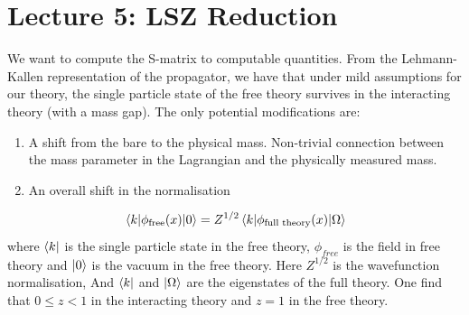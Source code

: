 \section{Lecture 5: LSZ Reduction }
We want to compute the S-matrix to computable quantities. From the Lehmann-Kallen representation of the propagator, we have that under mild assumptions for our theory, the single particle state of the free theory survives in the interacting theory (with a mass gap). The only potential modifications are:
\begin{enumerate}
    \item A shift from the bare to the physical mass. Non-trivial connection between the mass parameter in the Lagrangian and the physically measured mass.

    \item An overall shift in the normalisation
\end{enumerate}  
 \begin{equation}
        \mel{k}{\phi_{\text{free}}(x) }{0} = Z^{1/2}  \mel{k}{\phi_{\text{full theory}}(x) }{\Omega} 
    \end{equation} where $\bra{k}$ is the single particle state in the free theory, $\phi_{free}$ is the field in free theory and $\ket{0}$ is the vacuum in the free theory. Here $Z^{1/2}$ is the wavefunction normalisation, And $\bra{k}$ and $\ket{\Omega}$ are the eigenstates of the full theory. One find that $0 \leq z < 1$ in the interacting theory and $z = 1$ in the free theory.


